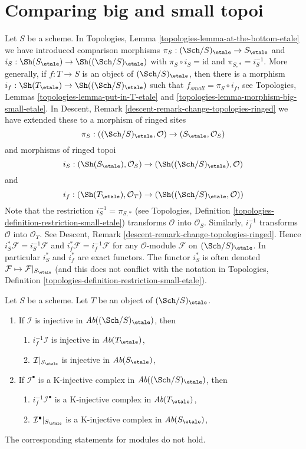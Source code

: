 \section{Comparing big and small topoi}
\label{section-compare}

\noindent
Let $S$ be a scheme. In
Topologies, Lemma \ref{topologies-lemma-at-the-bottom-etale}
we have introduced comparison morphisms
$\pi_S : (\Sch/S)_\etale \to S_\etale$ and
$i_S : \Sh(S_\etale) \to \Sh((\Sch/S)_\etale)$
with $\pi_S \circ i_S = \text{id}$ and $\pi_{S, *} = i_S^{-1}$.
More generally, if $f : T \to S$ is an object of $(\Sch/S)_\etale$,
then there is a morphism $i_f : \Sh(T_\etale) \to \Sh((\Sch/S)_\etale)$
such that $f_{small} = \pi_S \circ i_f$, see
Topologies, Lemmas \ref{topologies-lemma-put-in-T-etale} and
\ref{topologies-lemma-morphism-big-small-etale}. In
Descent, Remark \ref{descent-remark-change-topologies-ringed}
we have extended these to a morphism of ringed sites
$$
\pi_S : ((\Sch/S)_\etale, \mathcal{O}) \to (S_\etale, \mathcal{O}_S)
$$
and morphisms of ringed topoi
$$
i_S : (\Sh(S_\etale), \mathcal{O}_S) \to (\Sh((\Sch/S)_\etale), \mathcal{O})
$$
and
$$
i_f : (\Sh(T_\etale), \mathcal{O}_T) \to (\Sh((\Sch/S)_\etale, \mathcal{O}))
$$
Note that the restriction $i_S^{-1} = \pi_{S, *}$ (see
Topologies, Definition \ref{topologies-definition-restriction-small-etale})
transforms $\mathcal{O}$ into $\mathcal{O}_S$.
Similarly, $i_f^{-1}$ transforms $\mathcal{O}$ into $\mathcal{O}_T$.
See Descent, Remark \ref{descent-remark-change-topologies-ringed}.
Hence $i_S^*\mathcal{F} = i_S^{-1}\mathcal{F}$ and
$i_f^*\mathcal{F} = i_f^{-1}\mathcal{F}$ for any $\mathcal{O}$-module
$\mathcal{F}$ on $(\Sch/S)_\etale$. In particular $i_S^*$ and $i_f^*$
are exact functors. The functor $i_S^*$ is often denoted
$\mathcal{F} \mapsto \mathcal{F}|_{S_\etale}$ (and this does not
conflict with the notation in
Topologies, Definition \ref{topologies-definition-restriction-small-etale}).

\begin{lemma}
\label{lemma-compare-injectives}
Let $S$ be a scheme. Let $T$ be an object of $(\Sch/S)_\etale$.
\begin{enumerate}
\item If $\mathcal{I}$ is injective in $\textit{Ab}((\Sch/S)_\etale)$, then
\begin{enumerate}
\item $i_f^{-1}\mathcal{I}$ is injective in $\textit{Ab}(T_\etale)$,
\item $\mathcal{I}|_{S_\etale}$ is injective in $\textit{Ab}(S_\etale)$,
\end{enumerate}
\item If $\mathcal{I}^\bullet$ is a K-injective complex
in $\textit{Ab}((\Sch/S)_\etale)$, then
\begin{enumerate}
\item $i_f^{-1}\mathcal{I}^\bullet$ is a K-injective complex in
$\textit{Ab}(T_\etale)$,
\item $\mathcal{I}^\bullet|_{S_\etale}$ is a K-injective complex in
$\textit{Ab}(S_\etale)$,
\end{enumerate}
\end{enumerate}
The corresponding statements for modules do not hold.
\end{lemma}

